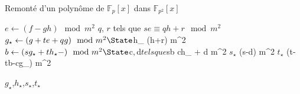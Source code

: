\begin{algorithm}
  \caption{Remonté d'un polynôme de $\mathbb{F}_p[x]$ dans $\mathbb{F}_{p^2}[x]$}
  \label{alg:step}  
  \begin{algorithmic}[1]
    \Statex
	
	\State $e \gets (f - gh) \mod m^2$
	\State $q$, $r$ tels que $se \equiv qh + r \mod m^2$
	\State $g_{\star} \gets (g+te+qg) \mod m^2
	\State $h_{\star} \gets (h+r) \mod m^2
	\State $b \gets (sg_{\star} + th_{\star} -) \mod m^2
	\State $c$, $d$ tels que $sb \equiv ch_{\star} + d \mod m^2
	\State $s_{\star}$ \gets (s-d) \mod m^2
	\State $t_{\star}$ \gets (t-tb-cg_{\star}) \mod m^2
	
	\State \Return $g_{\star}$,$h_{\star}$,$s_{\star}$,$t_{\star}$
    \EndFunction
  \end{algorithmic}
\end{algorithm}